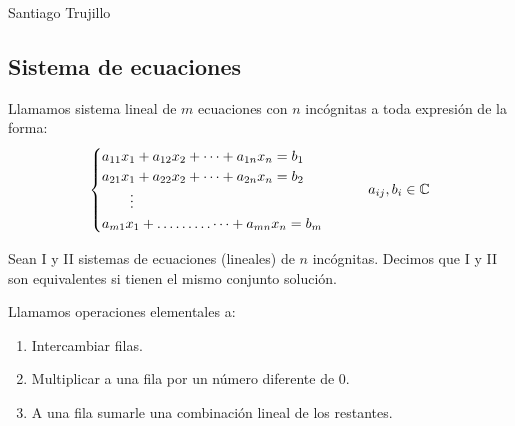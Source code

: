 \documentclass[11pt,a4paper]{article}
\begin{document}
\maketitle
\vspace{-1.6em}
\begin{center}
  {\normalsize Santiago Trujillo\par}
\end{center}
\vspace{0.5em}
\tableofcontents



\subsection{Sistema de ecuaciones}

Llamamos sistema lineal de $m$ ecuaciones con $n$ incógnitas a toda expresión de la forma:
\[
\begin{cases}
a_{11}x_1+a_{12}x_2+\dots+a_{1n}x_n=b_1\\
a_{21}x_1+a_{22}x_2+\dots+a_{2n}x_n=b_2\\
\qquad\vdots\\
a_{m1}x_1+\dots\dots\dots\dots+a_{mn}x_n=b_m
\end{cases}
\qquad a_{ij},b_i\in\mathbb{C}
\]

\begin{definicion}
Sean I y II sistemas de ecuaciones (lineales) de $n$ incógnitas. Decimos que I y II son equivalentes si tienen el mismo conjunto solución.
\end{definicion}

\begin{definicion}
Llamamos operaciones elementales a:
\begin{enumerate}[label=\arabic*)]
  \item Intercambiar filas.
  \item Multiplicar a una fila por un número diferente de $0$.
  \item A una fila sumarle una combinación lineal de los restantes.
\end{enumerate}
\end{definicion}

\end{document}

